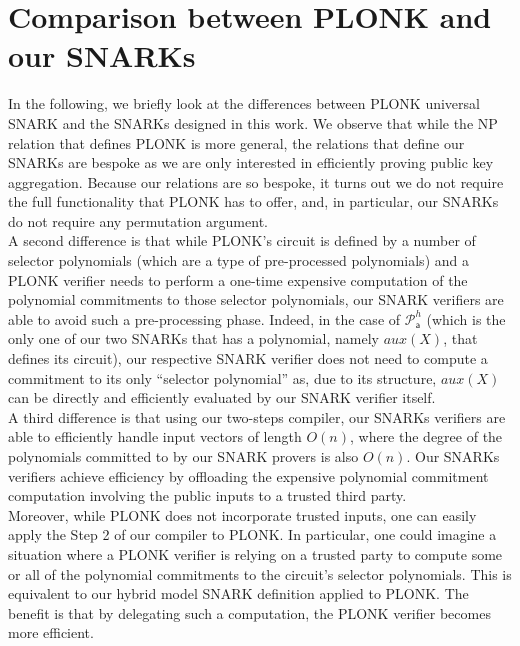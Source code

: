 \section{Comparison between PLONK and our SNARKs}
\label{suplementary_plonk_comparison}

\noindent In the following, we briefly look at the differences between PLONK universal SNARK and the SNARKs designed in this work. We observe 
that while the NP relation that defines PLONK is more general, the relations that define our SNARKs are bespoke as we are only interested in efficiently proving 
public key aggregation. Because our relations are so bespoke, it turns out we do not require the full functionality that PLONK has to offer, and, in particular, our SNARKs  
do not require any permutation argument. \\

\noindent A second difference is that while PLONK's circuit is defined by a number of selector 
polynomials (which are a type of pre-processed polynomials) and a PLONK verifier needs to perform 
a one-time expensive computation of the polynomial commitments to those selector polynomials, our SNARK verifiers 
are able to avoid such a pre-processing phase. Indeed, in the case of $\mathscr{P}^h_{\mathsf{a}}$ (which is the only one of 
our two SNARKs that has a polynomial, namely $\mathit{aux}(X)$, that defines its circuit), our respective SNARK verifier does not need to compute a 
commitment to its only ``selector polynomial'' as, due to its structure, $\mathit{aux}(X)$ can be directly and efficiently evaluated by our SNARK verifier itself. \\ 

\noindent A third difference is that using our two-steps compiler, our SNARKs verifiers are able to efficiently handle input vectors of length $O(n)$, 
where the degree of the polynomials committed to by our SNARK provers is also $O(n)$. Our SNARKs verifiers achieve efficiency by offloading the 
expensive polynomial commitment computation involving the public inputs to a trusted third party. \\

\noindent Moreover, while PLONK does not incorporate trusted inputs, one can easily apply the Step 2 of our compiler to PLONK. In particular, one could imagine a situation 
where a PLONK verifier is relying on a trusted party to compute some or all of the polynomial commitments to the circuit's selector polynomials. This is equivalent to our hybrid 
model SNARK definition applied to PLONK. The benefit is that by delegating such a computation, the PLONK verifier becomes more efficient. \\ %

